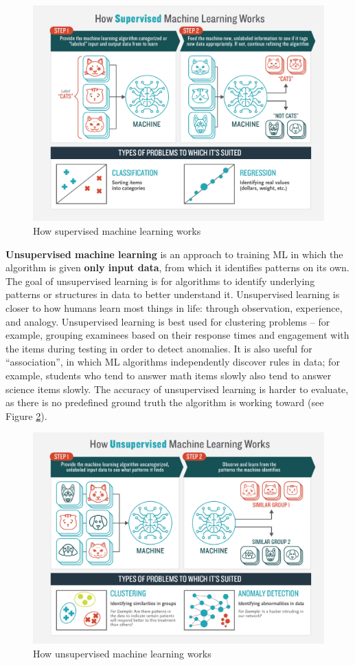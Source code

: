 \documentclass[]{book}
\begin{document}
\begin{figure}
\includegraphics[width=1\linewidth]{images/supervised_ml} \caption{How supervised machine learning works}\label{fig:fig5-5}
\end{figure}

\textbf{Unsupervised machine learning} is an approach to training ML in which the algorithm is given \textbf{only input data}, from which it identifies patterns on its own. The goal of unsupervised learning is for algorithms to identify underlying patterns or structures in data to better understand it. Unsupervised learning is closer to how humans learn most things in life: through observation, experience, and analogy. Unsupervised learning is best used for clustering problems -- for example, grouping examinees based on their response times and engagement with the items during testing in order to detect anomalies. It is also useful for ``association'', in which ML algorithms independently discover rules in data; for example, students who tend to answer math items slowly also tend to answer science items slowly. The accuracy of unsupervised learning is harder to evaluate, as there is no predefined ground truth the algorithm is working toward (see Figure \ref{fig:fig5-6}).

\begin{figure}
\includegraphics[width=1\linewidth]{images/unsupervised_ml} \caption{How unsupervised machine learning works}\label{fig:fig5-6}
\end{figure}
\end{document}
